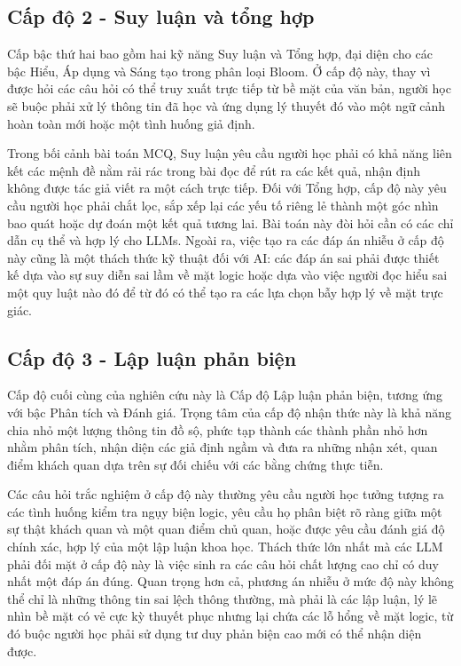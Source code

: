 \subsection{Cấp độ 2 - Suy luận và tổng hợp}

Cấp bậc thứ hai bao gồm hai kỹ năng Suy luận và Tổng hợp, đại diện cho các bậc Hiểu, Áp dụng và Sáng tạo trong phân loại Bloom. Ở cấp độ này, thay vì được hỏi các câu hỏi có thể truy xuất trực tiếp từ bề mặt của văn bản, người học sẽ buộc phải xử lý thông tin đã học và ứng dụng lý thuyết đó vào một ngữ cảnh hoàn toàn mới hoặc một tình huống giả định.

Trong bối cảnh bài toán MCQ, Suy luận yêu cầu người học phải có khả năng liên kết các mệnh đề nằm rải rác trong bài đọc để rút ra các kết quả, nhận định không được tác giả viết ra một cách trực tiếp. Đối với Tổng hợp, cấp độ này yêu cầu người học phải chắt lọc, sắp xếp lại các yếu tố riêng lẻ thành một góc nhìn bao quát hoặc dự đoán một kết quả tương lai. Bài toán này đòi hỏi cần có các chỉ dẫn cụ thể và hợp lý cho LLMs. Ngoài ra, việc tạo ra các đáp án nhiễu ở cấp độ này cũng là một thách thức kỹ thuật đối với AI: các đáp án sai phải được thiết kế dựa vào sự suy diễn sai lầm về mặt logic hoặc dựa vào việc người đọc hiểu sai một quy luật nào đó để từ đó có thể tạo ra các lựa chọn bẫy hợp lý về mặt trực giác. 

\subsection{Cấp độ 3 - Lập luận phản biện}

Cấp độ cuối cùng của nghiên cứu này là Cấp độ Lập luận phản biện, tương ứng với bậc Phân tích và Đánh giá. Trọng tâm của cấp độ nhận thức này là khả năng chia nhỏ một lượng thông tin đồ sộ, phức tạp thành các thành phần nhỏ hơn nhằm phân tích, nhận diện các giả định ngầm và đưa ra những nhận xét, quan điểm khách quan dựa trên sự đối chiếu với các bằng chứng thực tiễn.

Các câu hỏi trắc nghiệm ở cấp độ này thường yêu cầu người học tưởng tượng ra các tình huống kiểm tra ngụy biện logic, yêu cầu họ phân biệt rõ ràng giữa một sự thật khách quan và một quan điểm chủ quan, hoặc được yêu cầu đánh giá độ chính xác, hợp lý của một lập luận khoa học. Thách thức lớn nhất mà các LLM phải đối mặt ở cấp độ này là việc sinh ra các câu hỏi chất lượng cao chỉ có duy nhất một đáp án đúng. Quan trọng hơn cả, phương án nhiễu ở mức độ này không thể chỉ là những thông tin sai lệch thông thường, mà phải là các lập luận, lý lẽ nhìn bề mặt có vẻ cực kỳ thuyết phục nhưng lại chứa các lỗ hổng về mặt logic, từ đó buộc người học phải sử dụng tư duy phản biện cao mới có thể nhận diện được.

